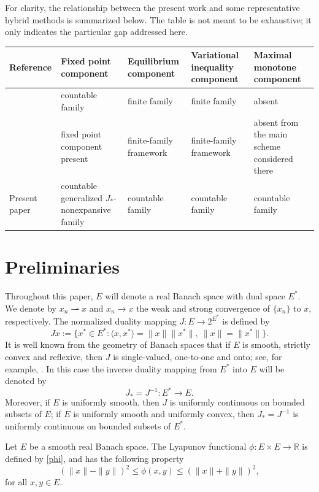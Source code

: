 \documentclass[10pt,a4paper]{amsart}
\numberwithin{equation}{section}
\begin{document}
For clarity, the relationship between the present work and some representative hybrid methods is summarized below. The table is not meant to be exhaustive; it only indicates the particular gap addressed here.
\begin{center}
\footnotesize
\setlength{\tabcolsep}{3pt}
\begin{tabular}{|>{\raggedright\arraybackslash}p{3.1cm}|>{\raggedright\arraybackslash}p{2.8cm}|>{\raggedright\arraybackslash}p{2.3cm}|>{\raggedright\arraybackslash}p{2.3cm}|>{\raggedright\arraybackslash}p{3.0cm}|}
\hline
Reference & Fixed point component & Equilibrium component & Variational inequality component & Maximal monotone component \\ \hline
\cite{UbaCarpathian2023} & countable family & finite family & finite family & absent \\ \hline
\cite{ZegeyeShahzad2011,ZegeyeShahzad2014} & fixed point component present & finite-family framework & finite-family framework & absent from the main scheme considered there \\ \hline
Present paper & countable generalized $J_{*}$-nonexpansive family & countable family & countable family & countable family \\ \hline
\end{tabular}
\end{center}

\section{Preliminaries}

Throughout this paper, $E$ will denote a real Banach space with dual space $E^{*}$. We denote by $x_n\rightharpoonup x$ and $x_n\to x$ the weak and strong convergence of $\{x_n\}$ to $x$, respectively. The normalized duality mapping $J:E\to 2^{E^{*}}$ is defined by
\[
Jx:=\{x^{*}\in E^{*}:\langle x,x^{*}\rangle=\|x\|\|x^{*}\|,\ \|x\|=\|x^{*}\|\}.
\]
It is well known from the geometry of Banach spaces that if $E$ is smooth, strictly convex and reflexive, then $J$ is single-valued, one-to-one and onto; see, for example, \cite{Cioranescu1990,Takahashi2000}. In this case the inverse duality mapping from $E^{*}$ into $E$ will be denoted by
\[
J_{*}=J^{-1}:E^{*}\to E.
\]
Moreover, if $E$ is uniformly smooth, then $J$ is uniformly continuous on bounded subsets of $E$; if $E$ is uniformly smooth and uniformly convex, then $J_{*}=J^{-1}$ is uniformly continuous on bounded subsets of $E^{*}$.

Let $E$ be a smooth real Banach space. The Lyapunov functional $\phi:E\times E\to\mathbb{R}$ is defined by \eqref{phi}, and has the following property
\begin{equation}\label{phibounds}
(\|x\|-\|y\|)^2\leq \phi(x,y)\leq (\|x\|+\|y\|)^2,
\end{equation}
for all $x,y\in E$.
\end{document}
